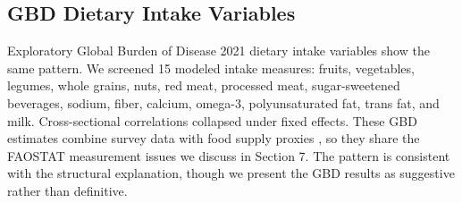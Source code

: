 \subsection{GBD Dietary Intake Variables}

Exploratory Global Burden of Disease 2021 dietary intake variables show the same pattern. We screened 15 modeled intake measures: fruits, vegetables, legumes, whole grains, nuts, red meat, processed meat, sugar-sweetened beverages, sodium, fiber, calcium, omega-3, polyunsaturated fat, trans fat, and milk. Cross-sectional correlations collapsed under fixed effects. These GBD estimates combine survey data with food supply proxies \cite{gbd2019}, so they share the FAOSTAT measurement issues we discuss in Section 7. The pattern is consistent with the structural explanation, though we present the GBD results as suggestive rather than definitive.
